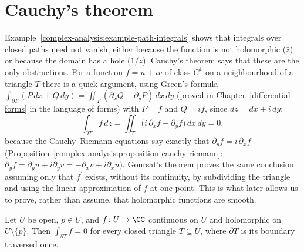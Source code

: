 \section{Cauchy's theorem}\label{complex-analysis:section-cauchy}

Example~\ref{complex-analysis:example-path-integrals} shows that integrals over closed paths need not vanish, either because the function is not holomorphic ($\bar z$) or because the domain has a hole
($1/z$). Cauchy's theorem says that these are the only obstructions. For a function $f = u + iv$ of class $C^1$ on a neighbourhood of a triangle $T$ there is a quick argument, using Green's formula
$\int_{\partial T}(P\,dx + Q\,dy) = \iint_T(\partial_xQ - \partial_yP)\,dx\,dy$ (proved in Chapter~\ref{differential-forms} in the language of forms) with $P = f$ and $Q = if$, since $dz = dx + i\,dy$:
\[
\int_{\partial T}f\,dz = \iint_T\bigl(i\,\partial_xf - \partial_yf\bigr)\,dx\,dy = 0,
\]
because the Cauchy--Riemann equations say exactly that $\partial_yf = i\,\partial_xf$ (Proposition~\ref{complex-analysis:proposition-cauchy-riemann}: $\partial_yf = \partial_yu + i\partial_yv = -\partial_xv + i\partial_xu$).
Goursat's theorem proves the same conclusion assuming only that $f^{\prime}$ exists, without its continuity, by subdividing the triangle and using the linear approximation of $f$ at one point. This is
what later allows us to prove, rather than assume, that holomorphic functions are smooth.

\begin{theorem}[Goursat]\label{complex-analysis:theorem-goursat}
Let $U$ be open, $p \in U$, and $f \colon U \to \CC$ continuous on $U$ and holomorphic on $U \setminus \{p\}$. Then $\int_{\partial T}f = 0$ for every closed triangle $T \subseteq U$, where $\partial T$ is its
boundary traversed once.
\end{theorem}

